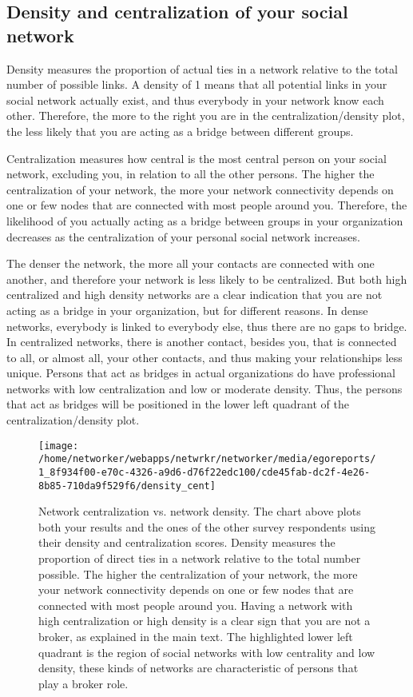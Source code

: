 \documentclass[a4paper,12pt]{article}
\begin{document}
\subsection*{Density and centralization of your social network}


Density measures the proportion of actual ties in a network relative to the total number of possible links. A density of 1 means that all potential links in your social network actually exist, and thus everybody in your network know each other. Therefore, the more to the right you are in the centralization/density plot, the less likely that you are acting as a bridge between different groups.

Centralization measures how central is the most central person on your social network, excluding you, in relation to all the other persons. The higher the centralization of your network, the more your network connectivity depends on one or few nodes that are connected with most people around you. Therefore, the likelihood of you actually acting as a bridge between groups in your organization decreases as the centralization of your personal social network increases.

The denser the network, the more all your contacts are connected with one another, and therefore your network is less likely to be centralized. But both high centralized and high density networks are a clear indication that you are not acting as a bridge in your organization, but for different reasons. In dense networks, everybody is linked to everybody else, thus there are no gaps to bridge. In centralized networks, there is another contact, besides you, that is connected to all, or almost all, your other contacts, and thus making your relationships less unique. Persons that act as bridges in actual organizations do have professional networks with low centralization and low or moderate density. Thus, the persons that act as bridges will be positioned in the lower left quadrant of the centralization/density plot.


\begin{figure}[H]
\centering
\texttt{[image: /home/networker/webapps/netwrkr/networker/media/egoreports/1\_8f934f00-e70c-4326-a9d6-d76f22edc100/cde45fab-dc2f-4e26-8b85-710da9f529f6/density\_cent]}
\caption{Network centralization vs. network density. The chart above plots both your results and the ones of the other survey respondents using their density and centralization scores. Density measures the proportion of direct ties in a network relative to the total number possible. The higher the centralization of your network, the more your network connectivity depends on one or few nodes that are connected with most people around you. Having a network with high centralization or high density is a clear sign that you are not a broker, as explained in the main text. The highlighted lower left quadrant is the region of social networks with low centrality and low density, these kinds of networks are characteristic of persons that play a broker role.}
\end{figure}
\end{document}
